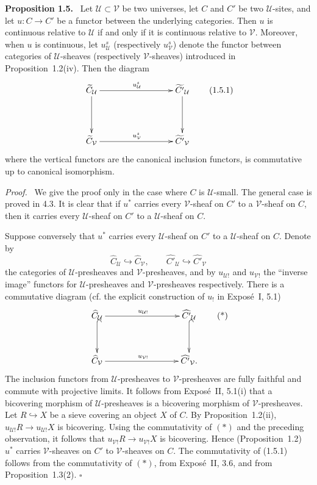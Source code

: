\documentclass[11pt]{article}
\newcommand{\U}{\mathcal{U}}
\newcommand{\V}{\mathcal{V}}
\newcommand{\qedtext}{\hfill\(\square\)}
\newenvironment{statement}[1]{\par\medskip\noindent\textbf{#1.}\ }{\par\medskip}
\newenvironment{prooftext}{\par\noindent\emph{Proof.}\ }{\par\medskip}
\begin{document}
\begin{statement}{Proposition 1.5}
Let \(\U\subset\V\) be two universes, let \(C\) and \(C'\) be two \(\U\)-sites, and let \(u:C\to C'\) be a functor between the underlying categories. Then \(u\) is continuous relative to \(\U\) if and only if it is continuous relative to \(\V\). Moreover, when \(u\) is continuous, let \(u^s_{\U}\) (respectively \(u^s_{\V}\)) denote the functor between categories of \(\U\)-sheaves (respectively \(\V\)-sheaves) introduced in Proposition~1.2(iv). Then the diagram
\[
\xymatrix@C=3cm@R=1.5cm{
\widetilde C_{\U}\ar[r]^{u^s_{\U}}\ar[d]& \widetilde{C'}_{\U}\ar[d]\\
\widetilde C_{\V}\ar[r]^{u^s_{\V}}& \widetilde{C'}_{\V}
}
\tag{1.5.1}
\]
where the vertical functors are the canonical inclusion functors, is commutative up to canonical isomorphism.
\end{statement}

\begin{prooftext}
We give the proof only in the case where \(C\) is \(\U\)-small. The general case is proved in 4.3. It is clear that if \(u^{\ast}\) carries every \(\V\)-sheaf on \(C'\) to a \(\V\)-sheaf on \(C\), then it carries every \(\U\)-sheaf on \(C'\) to a \(\U\)-sheaf on \(C\).

Suppose conversely that \(u^{\ast}\) carries every \(\U\)-sheaf on \(C'\) to a \(\U\)-sheaf on \(C\). Denote by
\[
\widehat C_{\U}\hookrightarrow\widehat C_{\V},\qquad
\widehat{C'}_{\U}\hookrightarrow\widehat{C'}_{\V}
\]
the categories of \(\U\)-presheaves and \(\V\)-presheaves, and by \(u_{\U!}\) and \(u_{\V!}\) the ``inverse image'' functors for \(\U\)-presheaves and \(\V\)-presheaves respectively. There is a commutative diagram (cf. the explicit construction of \(u_!\) in Expos\'e~I, 5.1)
\[
\xymatrix@C=3cm@R=1.25cm{
\widehat C_{\U}\ar[r]^{u_{\U!}}\ar@{^{(}->}[d]& \widehat{C'}_{\U}\ar@{^{(}->}[d]\\
\widehat C_{\V}\ar[r]^{u_{\V!}}& \widehat{C'}_{\V}.
}
\tag{*}
\]
The inclusion functors from \(\U\)-presheaves to \(\V\)-presheaves are fully faithful and commute with projective limits. It follows from Expos\'e~II, 5.1(i) that a bicov\-ering morphism of \(\U\)-presheaves is a bicov\-ering morphism of \(\V\)-presheaves. Let \(R\hookrightarrow X\) be a sieve covering an object \(X\) of \(C\). By Proposition~1.2(ii), \(u_{\U!}R\to u_{\U!}X\) is bicov\-ering. Using the commutativity of \((*)\) and the preceding observation, it follows that \(u_{\V!}R\to u_{\V!}X\) is bicov\-ering. Hence (Proposition~1.2) \(u^{\ast}\) carries \(\V\)-sheaves on \(C'\) to \(\V\)-sheaves on \(C\). The commutativity of (1.5.1) follows from the commutativity of \((*)\), from Expos\'e~II, 3.6, and from Proposition~1.3(2). \qedtext
\end{prooftext}
\end{document}
